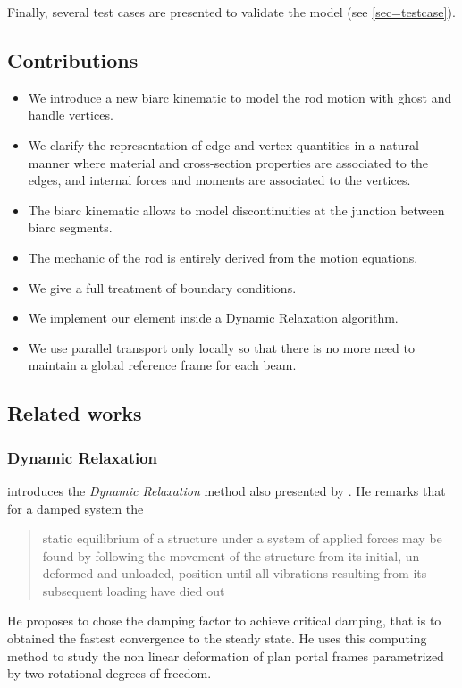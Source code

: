 Finally, several test cases are presented to validate the model (see \cref{sec=testcase}).

\subsection{Contributions}
\begin{itemize}
	\item We introduce a new  biarc kinematic to model the rod motion with ghost and handle vertices.
	\item We clarify the representation of edge and vertex quantities in a natural manner where material and cross-section properties are associated to the edges, and internal forces and moments are associated to the vertices.
	\item The biarc kinematic allows to model discontinuities at the junction between biarc segments.
	\item The mechanic of the rod is entirely derived from the motion equations.
	\item We give a full treatment of boundary conditions.
	\item We implement our element inside a Dynamic Relaxation algorithm.
	\item We use parallel transport only locally so that there is no more need to maintain a global reference frame for each beam.
\end{itemize}

\subsection{Related works}

\subsubsection{Dynamic Relaxation}

 introduces the \emph{Dynamic Relaxation} method also presented by . He remarks that for a damped system the \blockquote{static equilibrium of a structure under a system of applied forces may be found by following the movement of the structure from its initial, un-deformed and unloaded, position until all vibrations resulting from its subsequent loading have died out}. He proposes to chose the damping factor to achieve critical damping, that is to obtained the fastest convergence to the steady state. He uses this computing method to study the non linear deformation of plan portal frames parametrized by two rotational degrees of freedom.

